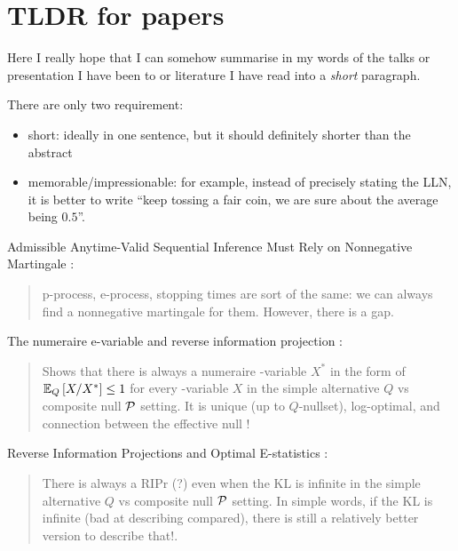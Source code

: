 \clearpage
\section{TLDR for papers}

Here I really hope that I can somehow summarise in my words of the talks or presentation
I have been to or literature I have read into a \textit{short} paragraph.

There are only two requirement:
\begin{itemize}
	\item short: ideally in one sentence, but it should definitely shorter than the abstract
	\item memorable/impressionable: for example, instead of precisely stating the LLN,
	      it is better to write ``keep tossing a fair coin, we are sure about the average being $0.5$''.
\end{itemize}


Admissible Anytime-Valid Sequential Inference Must Rely on Nonnegative Martingale \citep{ramdasAdmissibleAnytimevalidSequential2022}:
\begin{quote}
	p-process, e-process, stopping times are sort of the same: we can always find a nonnegative martingale for them.
	However, there is a gap.
\end{quote}

The numeraire e-variable and reverse information projection
\citep{larssonNumeraireEvariableReverse2024}:
\begin{quote}
	Shows that there is always a numeraire \E-variable $X^*$ in the form of $\operatorname{\mathbb{E}}_{Q} \left[ {X/X^*} \right] \leq 1$
	for every \E-variable $X$ in the simple alternative $Q$ vs composite null $\mathcal{P}$ setting.
	It is unique (up to $Q$-nullset), log-optimal, and connection between the effective null !
\end{quote}

Reverse Information Projections and Optimal E-statistics
\citep{lardyReverseInformationProjections2024}:
\begin{quote}
	There is always a RIPr (?) even when the KL is infinite in the simple alternative $Q$ vs composite null $\mathcal{P}$ setting.
	In simple words, if the KL is infinite (bad at describing compared), there is still a
	relatively better version to describe that!.
\end{quote}
